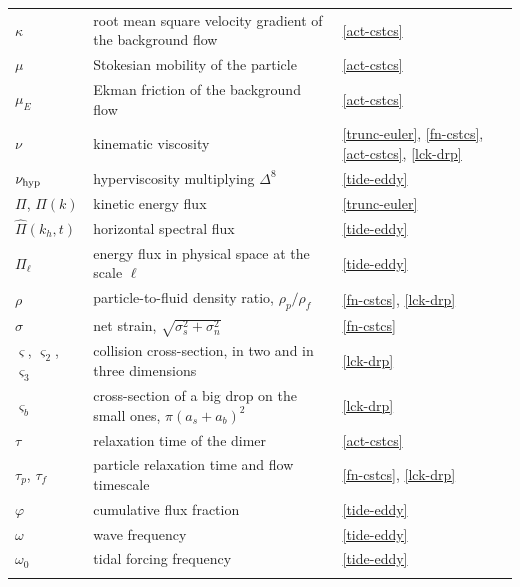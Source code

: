 \begin{longtable}{@{}p{}p{}p{}@{}}
$\kappa$ & root mean square velocity gradient of the background flow & \ref{act-cstcs} \\
$\mu$ & Stokesian mobility of the particle & \ref{act-cstcs} \\
$\mu_E$ & Ekman friction of the background flow & \ref{act-cstcs} \\
$\nu$ & kinematic viscosity & \ref{trunc-euler}, \ref{fn-cstcs}, \ref{act-cstcs}, \ref{lck-drp} \\
$\nu_{\rm hyp}$ & hyperviscosity multiplying $\Delta^8$ & \ref{tide-eddy} \\
$\Pi$, $\Pi(k)$ & kinetic energy flux & \ref{trunc-euler} \\
$\widehat{\Pi}(k_h,t)$ & horizontal spectral flux & \ref{tide-eddy} \\
$\Pi_\ell$ & energy flux in physical space at the scale $\ell$ & \ref{tide-eddy} \\
$\rho$ & particle-to-fluid density ratio, $\rho_p/\rho_f$ & \ref{fn-cstcs}, \ref{lck-drp} \\
$\sigma$ & net strain, $\sqrt{\sigma_s^2+\sigma_n^2}$ & \ref{fn-cstcs} \\
$\varsigma$, $\varsigma_2$, $\varsigma_3$ & collision cross-section, in two and in three dimensions & \ref{lck-drp} \\
$\varsigma_b$ & cross-section of a big drop on the small ones, $\pi(a_s+a_b)^2$ & \ref{lck-drp} \\
$\tau$ & relaxation time of the dimer & \ref{act-cstcs} \\
$\tau_p$, $\tau_f$ & particle relaxation time and flow timescale & \ref{fn-cstcs}, \ref{lck-drp} \\
$\varphi$ & cumulative flux fraction & \ref{tide-eddy} \\
$\omega$ & wave frequency & \ref{tide-eddy} \\
$\omega_0$ & tidal forcing frequency & \ref{tide-eddy} \\
\addlinespace


\end{longtable}
\endgroup
